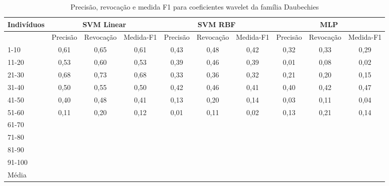 \documentclass[conference]{IEEEtran}
\begin{document}
\begin{table}[!t]
\caption{Precisão, revocação e medida F1 para coeficientes wavelet da família Daubechies}
\label{table_db2_metric}
\centering
\begin{tabular}{lccc|ccc|ccc} \hline
Indivíduos & \multicolumn{3}{c|}{SVM Linear} & \multicolumn{3}{c|}{SVM RBF} & \multicolumn{3}{c|}{MLP} \\ \hline
       & Precisão & Revocação & Medida-F1 & Precisão & Revocação & Medida-F1 & Precisão & Revocação & Medida-F1 \\ \hline
1-10   &   0,61   &   0,65    &   0,61    &   0,43   &   0,48    &   0,42    &   0,32   &   0,33    &   0,29    \\
11-20  &   0,53   &   0,60    &   0,53    &   0,39   &   0,46    &   0,39    &   0,01   &   0,08    &   0,02    \\
21-30  &   0,68   &   0,73    &   0,68    &   0,33   &   0,36    &   0,32    &   0,21   &   0,20    &   0,15    \\
31-40  &   0,50   &   0,55    &   0,50    &   0,42   &   0,46    &   0,41    &   0,40   &   0,42    &   0,47    \\
41-50  &   0,40   &   0,48    &   0,41    &   0,13   &   0,20    &   0,14    &   0,03   &   0,11    &   0,04    \\
51-60  &   0,11   &   0,20    &   0,12    &   0,01   &   0,11    &   0,02    &   0,13   &   0,21    &   0,14    \\
61-70  &          &           &           &          &           &           &          &           &           \\
71-80  &          &           &           &          &           &           &          &           &           \\
81-90  &          &           &           &          &           &           &          &           &           \\
91-100 &          &           &           &          &           &           &          &           &           \\ \hline
Média  &          &           &           &          &           &           &          &           &           \\
\end{tabular}
\end{table}
\end{document}
